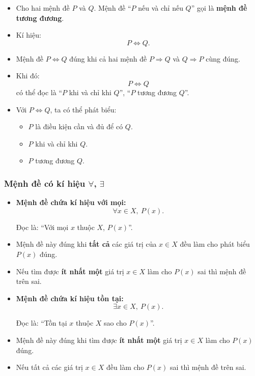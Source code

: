 \begin{kienthuc}
\begin{itemize}
	\item Cho hai mệnh đề $P$ và $Q$. Mệnh đề ``$P$ nếu và chỉ nếu $Q$'' gọi là \textbf{mệnh đề tương đương}.
	
	\item Kí hiệu:
	\[
	P\Leftrightarrow Q.
	\]
	
	\item Mệnh đề $P\Leftrightarrow Q$ đúng khi cả hai mệnh đề $P\Rightarrow Q$ và $Q\Rightarrow P$ cùng đúng.
	
	\item Khi đó:
	\[
	P\Leftrightarrow Q
	\]
	có thể đọc là ``$P$ khi và chỉ khi $Q$'', ``$P$ tương đương $Q$''.
\end{itemize}
\end{kienthuc}

\begin{emcothe}
\begin{itemize}
	\item Với $P\Leftrightarrow Q$, ta có thể phát biểu:
	\begin{itemize}
		\item $P$ là điều kiện cần và đủ để có $Q$.
		\item $P$ khi và chỉ khi $Q$.
		\item $P$ tương đương $Q$.
	\end{itemize}
\end{itemize}
\end{emcothe}

\subsubsection{Mệnh đề có kí hiệu $\forall$, $\exists$}


\begin{kienthuc}
\begin{itemize}
	\item \textbf{Mệnh đề chứa kí hiệu với mọi:}
	\[
	\forall x\in X,\ P(x).
	\]
	
	Đọc là: ``Với mọi $x$ thuộc $X$, $P(x)$''.
	
	\item Mệnh đề này đúng khi \textbf{tất cả} các giá trị của $x\in X$ đều làm cho phát biểu $P(x)$ đúng.
	
	\item Nếu tìm được \textbf{ít nhất một} giá trị $x\in X$ làm cho $P(x)$ sai thì mệnh đề trên sai.
	
	\item \textbf{Mệnh đề chứa kí hiệu tồn tại:}
	\[
	\exists x\in X,\ P(x).
	\]
	
	Đọc là: ``Tồn tại $x$ thuộc $X$ sao cho $P(x)$''.
	
	\item Mệnh đề này đúng khi tìm được \textbf{ít nhất một} giá trị $x\in X$ làm cho $P(x)$ đúng.
	
	\item Nếu tất cả các giá trị $x\in X$ đều làm cho $P(x)$ sai thì mệnh đề trên sai.
\end{itemize}
\end{kienthuc}

